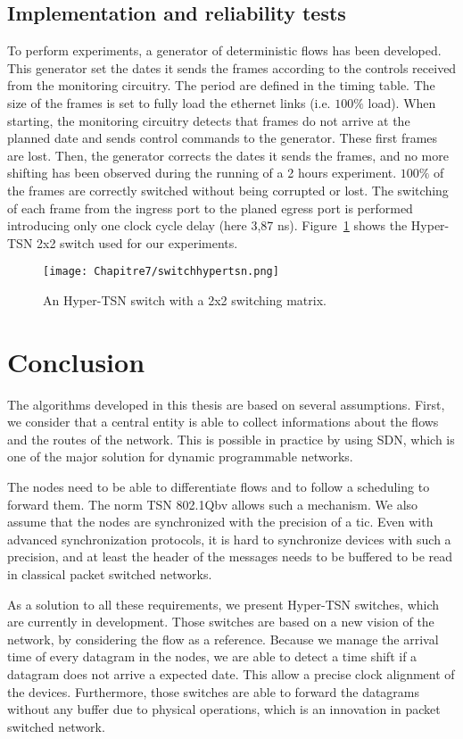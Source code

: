 \subsection{Implementation and reliability tests}

To perform experiments, a generator of deterministic flows has been developed. This generator set the dates it sends the frames according to the controls received from the monitoring circuitry. The period are defined in the timing table. The size of the frames is set to fully load the ethernet links (i.e. $100\%$ load).
When starting, the monitoring circuitry detects that frames do not arrive at the planned date and sends control commands to the generator. These first frames are lost. Then, the generator corrects the dates it sends the frames, and no more shifting has been observed during the running of a 2 hours experiment. $100\%$ of the frames are correctly switched without being corrupted or lost. The switching of each frame from the ingress port to the planed egress port is performed introducing only one clock cycle delay (here 3,87 ns).
Figure~\ref{fig:hypertsnswitch} shows the Hyper-TSN 2x2 switch used for our experiments.
\begin{center}

\begin{figure}[h]
  \centering
\texttt{[image: Chapitre7/switchhypertsn.png]}
\caption{ An Hyper-TSN switch with a 2x2 switching matrix.}
\label{fig:hypertsnswitch}
\end{figure}
\end{center}


\section*{Conclusion}
The algorithms developed in this thesis are based on several assumptions. First, we consider that a central entity is able to collect informations about the flows and the routes of the network. This is possible in practice by using SDN, which is one of the major solution for dynamic programmable networks. 

The nodes need to be able to differentiate flows and to follow a scheduling to forward them. The norm TSN 802.1Qbv allows such a mechanism.
We also assume that the nodes are synchronized with the precision of a tic. Even with advanced synchronization protocols, it is hard to synchronize devices with such a precision, and at least the header of the messages needs to be buffered to be read in classical packet switched networks.

As a solution to all these requirements, we present Hyper-TSN switches, which are currently in development. Those switches are based on a new vision of the network, by considering the flow as a reference. Because we manage the arrival time of every datagram in the nodes, we are able to detect a time shift if a datagram does not arrive a expected date. This allow a precise clock alignment of the devices. Furthermore, those switches are able to forward the datagrams without any buffer due to physical operations, which is an innovation in packet switched network.